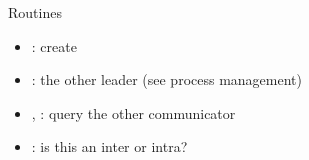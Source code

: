 \begin{frame}[containsverbatim]{Routines}
\label{sl:intercomm-routines}
\begin{itemize}
\item
  : create
\item {}: the other leader (see process management)
\item {}, :
  query the other communicator
\item {}: is this an inter or intra?
\end{itemize}
\end{frame}
